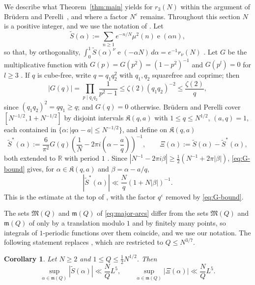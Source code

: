 \documentclass[11pt]{amsart}
\numberwithin{equation}{section}
\numberwithin{figure}{section}
\newtheorem{corollary}[lemma]{Corollary}
\theoremstyle{definition}
\newcommand{\R}{\mathbb{R}}
\newcommand{\e}{\operatorname{e}}
\newcommand{\eps}{\varepsilon}
\newcommand{\Major}{\mathfrak{M}}
\newcommand{\Minor}{\mathfrak{m}}
\begin{document}
We describe what Theorem~\ref{thm:main} yields for $r_3(N)$ within the
argument of Br\"udern and Perelli~\cite[Sections~4--5]{BP}, and where a
factor $N^{\eps}$ remains.  Throughout this section $N$ is a positive
integer, and we use the notation of \cite{BP}.  Let
\begin{equation}\label{eq:S-tilde}
  \tilde S(\alpha):=\sum_{n\ge1}e^{-n/N}\mu^2(n)\e(\alpha n),
\end{equation}
so that, by orthogonality, $\int_0^1\tilde S(\alpha)^\nu\e(-\alpha N)\,d\alpha=e^{-1}r_\nu(N)$
\cite[(34)]{BP}.  Let $G$ be the multiplicative function with
$G(p)=G(p^2)=(1-p^2)^{-1}$ and $G(p^l)=0$ for $l\ge3$
\cite[(10)]{BP}.  If $q$ is cube-free, write $q=q_1q_2^2$ with $q_1,q_2$
squarefree and coprime; then
\begin{equation}\label{eq:G-bound}
  |G(q)|=\prod_{p\mid q_1q_2}\frac1{p^2-1}
  \le\zeta(2)(q_1q_2)^{-2}\le\frac{\zeta(2)}q,
\end{equation}
since $(q_1q_2)^2=qq_1\ge q$; and $G(q)=0$ otherwise.  Br\"udern and
Perelli cover $[N^{-1/2},1+N^{-1/2}]$ by disjoint intervals
$\mathfrak K(q,a)$ with $1\le q\le N^{1/2}$, $(a,q)=1$, each contained in
$\{\alpha:|q\alpha-a|\le N^{-1/2}\}$, and define on $\mathfrak K(q,a)$
\begin{equation}\label{eq:S-star}
  \tilde S^*(\alpha):=\frac6{\pi^2}G(q)\left(\frac1N-2\pi i\left(\alpha-\frac aq\right)\right)^{-1},
  \qquad \Xi(\alpha):=\tilde S(\alpha)-\tilde S^*(\alpha),
\end{equation}
both extended to $\R$ with period $1$ \cite[(35), (36)]{BP}.  Since
$|N^{-1}-2\pi i\beta|\ge\frac12(N^{-1}+2\pi|\beta|)$, \eqref{eq:G-bound}
gives, for $\alpha\in\mathfrak K(q,a)$ and $\beta=\alpha-a/q$,
\begin{equation}\label{eq:S-star-bound}
  |\tilde S^*(\alpha)|\ll\frac Nq\left(1+N|\beta|\right)^{-1}.
\end{equation}
This is the estimate at the top of \cite[p.~607]{BP}, with the factor
$q^{\eps}$ removed by \eqref{eq:G-bound}.

The sets $\Major(Q)$ and $\Minor(Q)$ of \eqref{eq:major-arcs} differ from
the sets $\mathfrak M(Q)$ and $\mathfrak m(Q)$ of \cite{BP} only by a
translation modulo $1$ and by finitely many points, so integrals of
$1$-periodic functions over them coincide, and we use our notation.  The
following statement replaces \cite[Lemma~5 and (37)]{BP}, which are
restricted to $Q\le N^{3/7}$.

\begin{corollary}\label{cor:Xi}
Let $N\ge2$ and $1\le Q\le\frac12N^{1/2}$.  Then
\begin{equation}\label{eq:Xi-sup}
  \sup_{\alpha\in\Minor(Q)}|\tilde S(\alpha)|\ll\frac NQL^5,
  \qquad
  \sup_{\alpha\in\Minor(Q)}|\Xi(\alpha)|\ll\frac NQL^5.
\end{equation}
\end{corollary}
\end{document}
